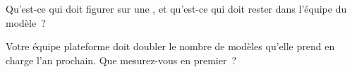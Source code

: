\begin{interviewq}\label{iq:ml:the-machine-learning-team:5}
Qu'est-ce qui doit figurer sur une , et qu'est-ce qui doit rester dans l'équipe du modèle~?
\end{interviewq}

\begin{interviewq}\label{iq:ml:the-machine-learning-team:6}
Votre équipe plateforme doit doubler le nombre de modèles qu'elle prend en charge l'an prochain. Que mesurez-vous en premier~?
\end{interviewq}
